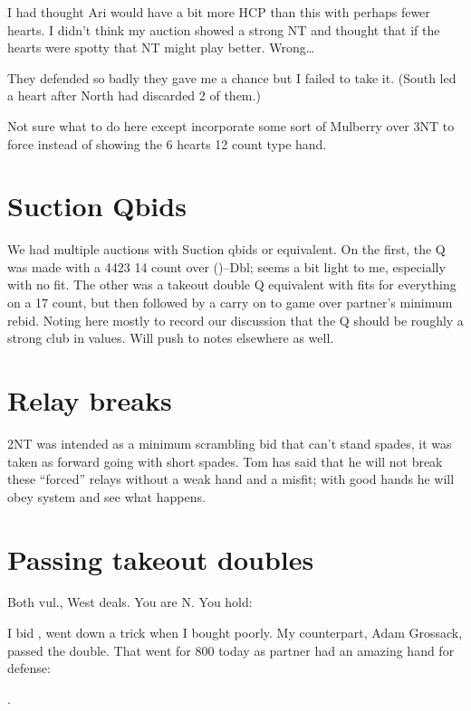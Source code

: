 \documentclass[tom-ari]{subfile}
\begin{document}
I had thought Ari would have a bit more HCP than this with perhaps fewer hearts.  I didn't think my auction showed a strong NT and thought that if the hearts were spotty that NT might play better.  Wrong\ldots

They defended so badly they gave me a chance but I failed to take it. (South led a heart after North had discarded 2 of them.)

Not sure what to do here except incorporate some sort of Mulberry over 3NT to force  instead of showing the 6 hearts 12 count type hand.

\section{Suction Qbids}
We had multiple auctions with Suction qbids or equivalent.  On the first, the Q was made with a 4423 14 count over ()--Dbl; seems a bit light to me, especially with no \ddd fit.  The other was a takeout double Q equivalent with fits for everything on a 17 count, but then followed by a carry on to game over partner's minimum rebid.  Noting here mostly to record our discussion that the Q should be roughly a strong club in values.  Will push to notes elsewhere as well.

\section{Relay breaks}

2NT was intended as a minimum scrambling bid that can't stand spades, it was taken as forward going with short spades.  Tom has said that he will not break these ``forced'' relays without a weak hand and a misfit; with good hands he will obey system and see what happens.

\section{Passing takeout doubles}

\begin{uhold}
	Both vul., West deals. You are N.  You hold: 
\end{uhold}

I bid , went down a trick when I bought poorly.  My counterpart, Adam Grossack, passed the double.  That went for 800 today as partner had an amazing hand for defense:  

.  
\end{document}
